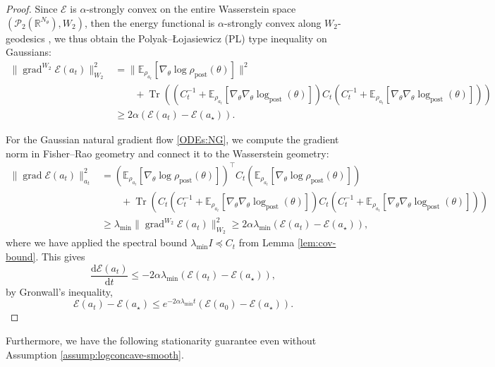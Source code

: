 \documentclass[11pt]{article}
\theoremstyle{plain}
\theoremstyle{definition}
\theoremstyle{remark}
\newcommand{\R}{\mathbb{R}}
\newcommand{\E}{\mathbb{E}}
\newcommand{\Tr}{\operatorname{Tr}}
\newcommand{\post}{\mathrm{post}}
\newcommand{\grad}{\operatorname{grad}}
\newcommand{\dd}{\mathrm{d}}
\begin{document}
\begin{proof}
    Since $\mathcal{E}$ is $\alpha$-strongly convex on the entire Wasserstein space $(\mathcal{P}_2 (\R^{N_\theta}), W_2)$, then the energy functional is $\alpha$-strongly convex along $W_2$-geodesics \cite{lambert2022variational}, we thus obtain the Polyak--Łojasiewicz (PL) type inequality on Gaussians:
    \begin{align*}
        \| \grad^{W_2} \mathcal{E} (a_t) \|_{W_2}^2 &= \| \E_{\rho_{a_t}} [\nabla_\theta \log \rho_\post (\theta)] \|^2 \\
        &\qquad + \Tr ((C_t^{-1} + \E_{\rho_{a_t}} [\nabla_\theta \nabla_\theta \log_\post (\theta)]) C_t (C_t^{-1} + \E_{\rho_{a_t}} [\nabla_\theta \nabla_\theta \log_\post (\theta)])) \\
        &\geq 2\alpha (\mathcal{E}(a_t) - \mathcal{E} (a_\star)).
    \end{align*}

    For the Gaussian natural gradient flow \eqref{ODEs:NG}, we compute the gradient norm in Fisher--Rao geometry and connect it to the Wasserstein geometry:
    \begin{align*}
        \| \grad \mathcal{E}(a_t) \|_{a_t}^2 &= (\E_{\rho_{a_t}} [\nabla_\theta \log \rho_\post (\theta)])^\top C_t (\E_{\rho_{a_t}} [\nabla_\theta \log \rho_\post (\theta)]) \\
        &\qquad + \Tr (C_t (C_t^{-1} + \E_{\rho_{a_t}} [\nabla_\theta \nabla_\theta \log_\post (\theta)]) C_t (C_t^{-1} + \E_{\rho_{a_t}} [\nabla_\theta \nabla_\theta \log_\post (\theta)])) \\
        &\geq \lambda_{\min} \| \grad^{W_2} \mathcal{E} (a_t) \|_{W_2}^2 \geq 2\alpha \lambda_{\min} (\mathcal{E} (a_t) - \mathcal{E}(a_\star)),
    \end{align*}
    where we have applied the spectral bound $\lambda_{\min} I \preceq C_t$ from Lemma \ref{lem:cov-bound}. This gives 
    \begin{equation*}
        \frac{\dd \mathcal{E} (a_t)}{\dd t} \leq -2\alpha \lambda_{\min} (\mathcal{E} (a_t) - \mathcal{E} (a_\star)),
    \end{equation*}
    by Gronwall's inequality, 
    \begin{equation*}
        \mathcal{E}(a_t) - \mathcal{E} (a_\star) \leq e^{-2\alpha \lambda_{\min} t} (\mathcal{E} (a_0) - \mathcal{E} (a_\star)).
    \end{equation*}
\end{proof}

Furthermore, we have the following stationarity guarantee even without Assumption \ref{assump:logconcave-smooth}.
\end{document}
